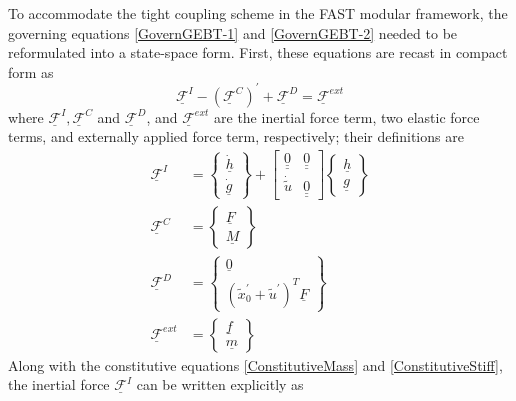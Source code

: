 \documentclass{aiaa-tc}
\renewcommand{\vec}[1]{\underline{#1}}
\begin{document}
To accommodate the tight coupling scheme in the FAST modular framework, the governing equations 
\eqref{GovernGEBT-1} and \eqref{GovernGEBT-2} needed to be reformulated
into a state-space form. First, these equations are recast in compact form
as
\begin{equation}
    \label{CompactGovernGEBT}
    \underline{\mathcal{F}}^I - (\underline{\mathcal{F}}^{C})^\prime + \underline{\mathcal{F}}^D = \underline{\mathcal{F}}^{ext}
\end{equation}
where $\underline{\mathcal{F}}^I, \underline{\mathcal{F}}^C$ and $\underline{\mathcal{F}}^D$, and $\underline{\mathcal{F}}^{ext}$ are the inertial force term, two elastic force terms, and externally applied force term, respectively; their definitions are
\begin{align}
    \label{InertialForce}
    \underline{\mathcal{F}}^I &= \begin{Bmatrix}
    \dot{\underline{h}} \\
    \dot{\underline{g}}
    \end{Bmatrix}
    + \begin{bmatrix}
    \underline{\underline{0}} & \underline{\underline{0}} \\
    \dot{\tilde{u}}  &  \underline{\underline{0}}
    \end{bmatrix}
    \begin{Bmatrix}
    \vec{h} \\
    \vec{g}
    \end{Bmatrix} \\
    \label{ElasticForceFc}
     \underline{\mathcal{F}}^C &= \begin{Bmatrix}
    \underline{F} \\
    \underline{M}
    \end{Bmatrix} \\
    \label{ElasticForceFd}
    \underline{\mathcal{F}}^D &= \begin{Bmatrix}
    \underline{0} \\
    (\tilde{x}^\prime_0 + \tilde{u}^\prime)^T \underline{F}
    \end{Bmatrix} \\
    \label{AppliedForce}
    \underline{\mathcal{F}}^{ext} &= \begin{Bmatrix}
    \underline{f} \\
    \underline{m}
    \end{Bmatrix}
\end{align}   
Along with the constitutive equations \eqref{ConstitutiveMass} and \eqref{ConstitutiveStiff}, the inertial force $\underline{\mathcal{F}}^I$ can be written explicitly as
\end{document}
